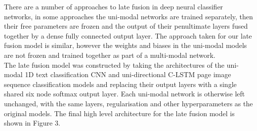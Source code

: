 \documentclass[a4paper,12pt]{article}
\begin{document}
There are a number of approaches to late fusion in deep neural classifier networks, in some approaches the uni-modal networks are trained separately, then their free parameters are frozen and the output of their penultimate layers fused together by a dense fully connected output layer. The approach taken for our late fusion model is similar, however the weights and biases in the uni-modal models are not frozen and trained together as part of a multi-modal network.\\

The late fusion model was constructed by taking the architectures of the uni-modal 1D text classification CNN and uni-directional C-LSTM page image sequence classification models and replacing their output layers with a single shared six node softmax output layer. Each uni-modal network is otherwise left unchanged, with the same layers, regularisation and other hyperparameters as the original models. The final high level architecture for the late fusion model is shown in Figure 3. \\
\end{document}

